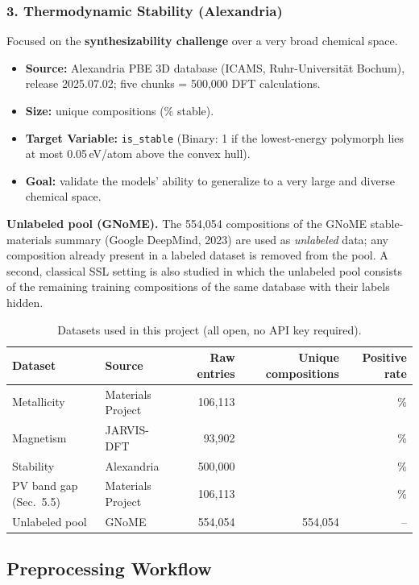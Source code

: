 \subsubsection{3. Thermodynamic Stability (Alexandria)}
Focused on the \textbf{synthesizability challenge} over a very broad chemical space.
\begin{itemize}
  \item \textbf{Source:} Alexandria PBE 3D database (ICAMS, Ruhr-Universit\"at Bochum), release
  2025.07.02; five chunks = 500,000 DFT calculations.
  \item \textbf{Size:} \StabN{} unique compositions (\StabPos{}\% stable).
  \item \textbf{Target Variable:} \texttt{is\_stable} (Binary: 1 if the lowest-energy polymorph
  lies at most 0.05\,eV/atom above the convex hull).
  \item \textbf{Goal:} validate the models' ability to generalize to a very large and diverse
  chemical space.
\end{itemize}

\textbf{Unlabeled pool (GNoME).} The 554,054 compositions of the GNoME stable-materials summary
(Google DeepMind, 2023) are used as \emph{unlabeled} data; any composition already present in a
labeled dataset is removed from the pool. A second, classical SSL setting is also studied in
which the unlabeled pool consists of the remaining training compositions of the same database
with their labels hidden.

\begin{table}[H]
\centering\small
\begin{tabular}{llrrr}
\toprule
Dataset & Source & Raw entries & Unique compositions & Positive rate\\
\midrule
Metallicity & Materials Project & 106,113 & \MetalN{} & \MetalPos{}\%\\
Magnetism & JARVIS-DFT & 93,902 & \MagN{} & \MagPos{}\%\\
Stability & Alexandria & 500,000 & \StabN{} & \StabPos{}\%\\
PV band gap (Sec.~5.5) & Materials Project & 106,113 & \GapN{} & \GapPos{}\%\\
Unlabeled pool & GNoME & 554,054 & 554,054 & --\\
\bottomrule
\end{tabular}
\caption*{Datasets used in this project (all open, no API key required).}
\end{table}

\clearpage
\subsection{Preprocessing Workflow}

